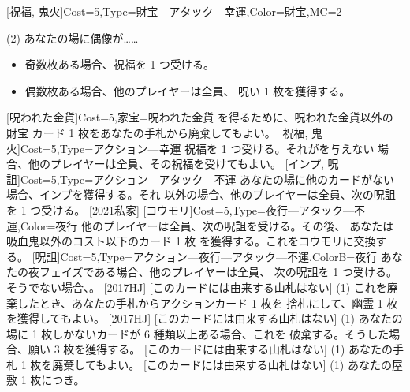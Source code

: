 \documentclass{waku}
\begin{document}
[祝福, 鬼火]{Cost=5,Type=財宝—アタック—幸運,Color=財宝,MC=2}{
	\Vanilla(2){}
	あなたの場に偶像が……
	\begin{itemize}
		\item 奇数枚ある場合、祝福を 1 つ受ける。
		\item 偶数枚ある場合、他のプレイヤーは全員、
			呪い 1 枚を獲得する。
	\end{itemize}
}
[呪われた金貨]{Cost=5,家宝=呪われた金貨}{
	を得るために、呪われた金貨以外の財宝
	カード 1 枚をあなたの手札から廃棄してもよい。
}
[祝福, 鬼火]{Cost=5,Type=アクション—幸運}{
	祝福を 1 つ受ける。それがを与えない
	場合、他のプレイヤーは全員、その祝福を受けてもよい。
}
[インプ, 呪詛]{Cost=5,Type=アクション—アタック—不運}{
	あなたの場に他のカードがない場合、インプを獲得する。それ
	以外の場合、他のプレイヤーは全員、次の呪詛を 1 つ受ける。
}[2021私家]
[コウモリ]{Cost=5,Type=夜行—アタック—不運,Color=夜行}{
	他のプレイヤーは全員、次の呪詛を受ける。その後、
	あなたは吸血鬼以外のコスト以下のカード 1 枚
	を獲得する。これをコウモリに交換する。
}
[呪詛]{Cost=5,Type=アクション—夜行—アタック—不運,ColorB=夜行}{
	あなたの夜フェイズである場合、他のプレイヤーは全員、
	次の呪詛を 1 つ受ける。そうでない場合、。
}[2017HJ]
[このカードには由来する山札はない]{
	\Vanilla(1){}
	\hmbar
	これを廃棄したとき、あなたの手札からアクションカード 1 枚を
	捨札にして、幽霊 1 枚を獲得してもよい。
}[2017HJ]
[このカードには由来する山札はない]{
	\Vanilla(1){}
	あなたの場に 1 枚しかないカードが 6 種類以上ある場合、これを
	破棄する。そうした場合、願い 3 枚を獲得する。
}
[このカードには由来する山札はない]{
	\Vanilla(1){}
	あなたの手札 1 枚を廃棄してもよい。
}
[このカードには由来する山札はない]{
	\Vanilla(1){}
	\hmbar
	あなたの屋敷 1 枚につき\VP[1]。
}
\end{document}
